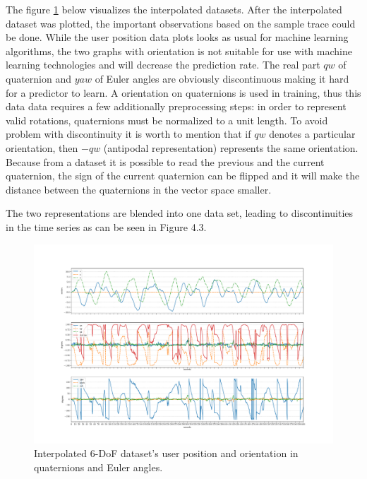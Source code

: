 The figure \ref{fig:inter_data} below visualizes the interpolated datasets. After the interpolated dataset was plotted, the important observations based on the sample trace could be done. While the user position data plots looks as usual for machine learning algorithms, the two graphs with orientation is not suitable for use with machine learning technologies and will decrease the prediction rate. The real part $qw$ of quaternion and $yaw$ of Euler angles are obviously discontinuous making it hard for a predictor to learn. A orientation on quaternions is used in training, thus this data data requires a few additionally preprocessing steps: in order to represent valid rotations, quaternions must be normalized to a unit length. To avoid problem with discontinuity it is worth to mention that if $qw$ denotes a particular orientation, then $-qw$ (antipodal representation) represents the same orientation. Because from a dataset it is possible to read the previous and the current quaternion, the sign of the current quaternion can be flipped and it will make the distance between the quaternions in the vector space smaller.

 The two representations are blended into one data set, leading to discontinuities in the time series as can be seen in Figure 4.3.

\begin{figure}[htb]
	\begin{center}
		\includegraphics[width=1\textwidth, keepaspectratio]{gfx/Fig-1556-interpolated.pdf}
		\caption{\label{fig:inter_data}Interpolated 6-DoF dataset's user position and orientation in quaternions and Euler angles.}
	\end{center}
\end{figure}

